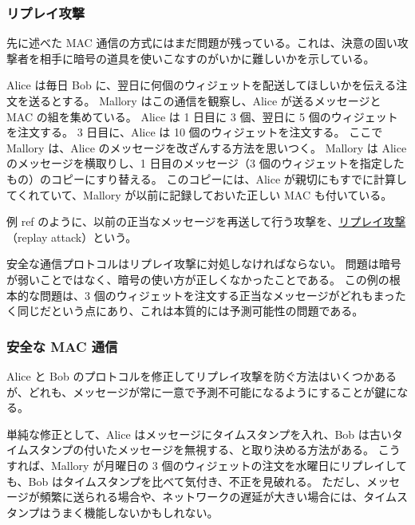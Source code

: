 \documentclass[uplatex]{jsarticle}
\def\ref#1{ref}%
\def\label#1{}%
\begin{document}
\subsubsection{リプレイ攻撃}

先に述べた MAC 通信の方式にはまだ問題が残っている。これは、決意の固い攻撃者を相手に暗号の道具を使いこなすのがいかに難しいかを示している。

\begin{exa}[ウィジェットの注文のリプレイ]\label{exa:ch5-widget-replay}
Alice は毎日 Bob に、翌日に何個のウィジェットを配送してほしいかを伝える注文を送るとする。
Mallory はこの通信を観察し、Alice が送るメッセージと MAC の組を集めている。
Alice は 1 日目に 3 個、翌日に 5 個のウィジェットを注文する。
3 日目に、Alice は 10 個のウィジェットを注文する。
ここで Mallory は、Alice のメッセージを改ざんする方法を思いつく。
Mallory は Alice のメッセージを横取りし、1 日目のメッセージ（3 個のウィジェットを指定したもの）のコピーにすり替える。
このコピーには、Alice が親切にもすでに計算してくれていて、Mallory が以前に記録しておいた正しい MAC も付いている。
\end{exa}

\begin{dfn}[リプレイ攻撃]\label{dfn:ch5-replay-attack}
例 \ref{exa:ch5-widget-replay} のように、以前の正当なメッセージを再送して行う攻撃を、\underline{リプレイ攻撃}（replay attack）という。
\end{dfn}

安全な通信プロトコルはリプレイ攻撃に対処しなければならない。
問題は暗号が弱いことではなく、暗号の使い方が正しくなかったことである。
この例の根本的な問題は、3 個のウィジェットを注文する正当なメッセージがどれもまったく同じだという点にあり、これは本質的には予測可能性の問題である。

\subsubsection{安全な MAC 通信}

Alice と Bob のプロトコルを修正してリプレイ攻撃を防ぐ方法はいくつかあるが、どれも、メッセージが常に一意で予測不可能になるようにすることが鍵になる。

\begin{exa}[タイムスタンプによる修正]\label{exa:ch5-timestamp}
単純な修正として、Alice はメッセージにタイムスタンプを入れ、Bob は古いタイムスタンプの付いたメッセージを無視する、と取り決める方法がある。
こうすれば、Mallory が月曜日の 3 個のウィジェットの注文を水曜日にリプレイしても、Bob はタイムスタンプを比べて気付き、不正を見破れる。
ただし、メッセージが頻繁に送られる場合や、ネットワークの遅延が大きい場合には、タイムスタンプはうまく機能しないかもしれない。
\end{exa}
\end{document}

